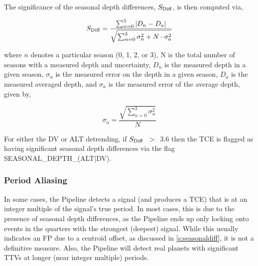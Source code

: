 The significance of the seasonal depth differences, $S_{\rm Diff}$, is then computed via,

\begin{equation}
    S_{\rm Diff} = \frac{\sum_{n=0}^{3} \left|D_{n} - D_{a}\right|}{\sqrt{\sum_{n=0}^3 \sigma_{n}^{2} + N\cdot\sigma_{a}^{2}}}
\end{equation}

\noindent where $n$ denotes a particular season (0, 1, 2, or 3), N is the total number of seasons with a measured depth and uncertainty, $D_{n}$ is the measured depth in a given season, $\sigma_{n}$ is the measured error on the depth in a given season, $D_{a}$ is the measured averaged depth, and $\sigma_{a}$ is the measured error of the average depth, given by,

\begin{equation}
    \sigma_{a} = \frac{\sqrt{\sum_{n=0}^{3}\sigma_{n}^2}}{N}
\end{equation}

\noindent For either the DV or ALT detrending, if $S_{\rm Diff}$~$>$~3.6 then the TCE is flagged as having significant seasonal depth differences via the flag SEASONAL\_DEPTH\_(ALT|DV).


\subsubsection{Period Aliasing}
\label{s:periodalias}

In some cases, the \kepler{} Pipeline detects a signal (and produces a TCE) that is at an integer multiple of the signal's true period. In most cases, this is due to the presence of seasonal depth differences, as the Pipeline ends up only locking onto events in the quarters with the strongest (deepest) signal. While this usually indicates an FP due to a centroid offset, as discussed in \ref{s:seasonaldiff}, it is not a definitive measure. Also, the Pipeline will detect real planets with significant TTVs at longer (near integer multiple) periods.

